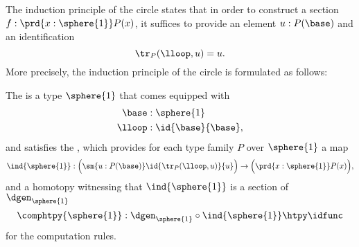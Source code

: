 The induction principle of the circle states that in order to construct a section $f:\prd{x:\sphere{1}}P(x)$, it suffices to provide an element $u:P(\base)$ and an identification
\begin{equation*}
  \tr_P(\lloop,u)=u.
\end{equation*}
More precisely, the induction principle of the circle is formulated as follows:

\begin{defn}
The  is a type $\sphere{1}$ that comes equipped with
\begin{align*}
\base & : \sphere{1} \\
\lloop & : \id{\base}{\base},
\end{align*}
and satisfies the , which provides for each type family $P$ over $\sphere{1}$ a map
\begin{equation*}
\ind{\sphere{1}}:\Big(\sm{u:P(\base)}\id{\tr_P(\lloop,u)}{u}\Big)\to \Big(\prd{x:\sphere{1}}P(x)\Big),
\end{equation*}
and a homotopy witnessing that $\ind{\sphere{1}}$ is a section of $\dgen_{\sphere{1}}$
\begin{equation*}
\comphtpy{\sphere{1}}:\dgen_{\sphere{1}}\circ \ind{\sphere{1}}\htpy \idfunc
\end{equation*}
for the computation rules.
\end{defn}

